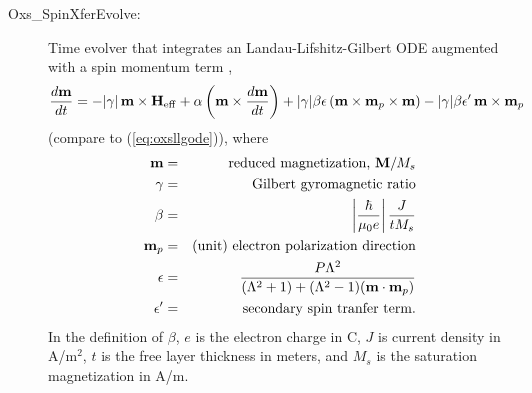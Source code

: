 \begin{description}
%
\item[Oxs\_SpinXferEvolve:\label{html:SpinXferEvolve}]
Time evolver that integrates an
Landau-Lifshitz-Gilbert ODE augmented with a
spin momentum term \cite{xiao2004},
\begin{equation}
\htmlimage{antialias}
  \frac{d\vm}{dt} = -|\gamma|\,\vm\times\vH_{\rm eff}
   + \alpha
     \left(\vm\times\frac{d\vm}{dt}\right)
   + |\gamma|\beta\epsilon
     \left(\vm\times\vm_p\times\vm\right)
   - |\gamma|\beta\epsilon^\prime\,\vm\times\vm_p
\label{eq:oxsllgspinxfer}
\end{equation}
(compare to (\ref{eq:oxsllgode})), where
\begin{eqnarray*}
\textbf{m} & = & \mbox{reduced magnetization, $\textbf{M}/M_s$} \\
\gamma & = & \mbox{Gilbert gyromagnetic ratio} \\
\beta & = & \left|\frac{\hbar}{\mu_0 e}\right|\frac{J}{t M_s} \\
\textbf{m}_p & = & \mbox{(unit) electron polarization direction} \\
\epsilon & = &
\frac{P\Lambda^2}{(\Lambda^2+1)+(\Lambda^2-1)(\textbf{m}\cdot\textbf{m}_p)} \\
\epsilon^\prime & = & \mbox{secondary spin tranfer term}.
\end{eqnarray*}
In the definition of $\beta$, $e$ is the electron charge in C, $J$ is
current density in A/m${}^2$, $t$ is the free layer thickness in meters,
and $M_s$ is the saturation magnetization in A/m.


\end{description}
